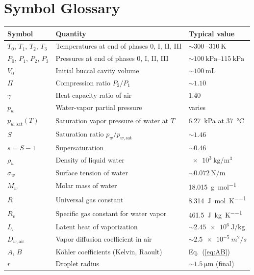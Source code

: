 \documentclass[11pt,a4paper]{article}
\newcommand{\pwsat}{p_{w,\text{sat}}}
\theoremstyle{definition}
\theoremstyle{plain}
\begin{document}
\appendix

\section{Symbol Glossary}
\label{app:glossary}

\begin{tabular}{@{}lll@{}}
\toprule
\textbf{Symbol} & \textbf{Quantity} & \textbf{Typical value} \\
\midrule
$T_0$, $T_1$, $T_2$, $T_3$ & Temperatures at end of phases 0, I, II, III & $\sim\SI{300}{}$--$\SI{310}{\kelvin}$ \\
$P_0$, $P_1$, $P_2$, $P_3$ & Pressures at end of phases 0, I, II, III & $\sim\SIrange{100}{115}{\kilo\pascal}$ \\
$V_0$ & Initial buccal cavity volume & $\sim\SI{100}{\milli\liter}$ \\
$\Pi$ & Compression ratio $P_2/P_1$ & $\sim 1.10$ \\
$\gamma$ & Heat capacity ratio of air & $1.40$ \\
$p_w$ & Water-vapor partial pressure & varies \\
$\pwsat(T)$ & Saturation vapor pressure of water at $T$ & \SI{6.27}{\kilo\pascal} at \SI{37}{\celsius} \\
$S$ & Saturation ratio $p_w/\pwsat$ & $\sim 1.46$ \\
$s = S-1$ & Supersaturation & $\sim 0.46$ \\
$\rho_w$ & Density of liquid water & $\SI{e3}{\kilo\gram\per\cubic\meter}$ \\
$\sigma_w$ & Surface tension of water & $\sim\SI{0.072}{\newton\per\meter}$ \\
$M_w$ & Molar mass of water & \SI{18.015}{\gram\per\mole} \\
$R$ & Universal gas constant & \SI{8.314}{\joule\per\mole\per\kelvin} \\
$R_v$ & Specific gas constant for water vapor & \SI{461.5}{\joule\per\kilogram\per\kelvin} \\
$L_v$ & Latent heat of vaporization & $\sim\SI{2.45e6}{\joule\per\kilogram}$ \\
$D_{w,\text{air}}$ & Vapor diffusion coefficient in air & $\sim\SI{2.5e-5}{m^2/s}$ \\
$A$, $B$ & Köhler coefficients (Kelvin, Raoult) & Eq.~(\ref{eq:AB}) \\
$r$ & Droplet radius & $\sim\SI{1.5}{\micro\meter}$ (final) \\

\end{tabular}
\end{document}
